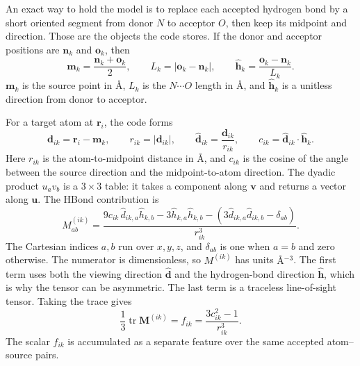 \documentclass[11pt]{article}
\begin{document}
An exact way to hold the model is to replace each accepted hydrogen bond by a
short oriented segment from donor \(N\) to acceptor \(O\), then keep its
midpoint and direction. Those are the objects the code stores. If the donor and
acceptor positions are \(\bm n_k\) and \(\bm o_k\), then
\begin{equation}
  \bm m_k = \frac{\bm n_k+\bm o_k}{2},\qquad
  L_k = |\bm o_k-\bm n_k|,\qquad
  \hat{\bm h}_k = \frac{\bm o_k-\bm n_k}{L_k}.
  \label{eq:source}
\end{equation}
\(\bm m_k\) is the source point in \(\si{\angstrom}\), \(L_k\) is the
\(N\cdots O\) length in \(\si{\angstrom}\), and \(\hat{\bm h}_k\) is a
unitless direction from donor to acceptor.

For a target atom at \(\bm r_i\), the code forms
\begin{equation}
  \bm d_{ik} = \bm r_i-\bm m_k,\qquad
  r_{ik}=|\bm d_{ik}|,\qquad
  \hat{\bm d}_{ik}=\frac{\bm d_{ik}}{r_{ik}},\qquad
  c_{ik}=\hat{\bm d}_{ik}\cdot\hat{\bm h}_k .
  \label{eq:obs}
\end{equation}
Here \(r_{ik}\) is the atom-to-midpoint distance in \(\si{\angstrom}\), and
\(c_{ik}\) is the cosine of the angle between the source direction and the
midpoint-to-atom direction. The dyadic product \(u_a v_b\) is a \(3\times 3\)
table: it takes a component along \(\bm v\) and returns a vector along
\(\bm u\). The HBond contribution is
\begin{equation}
  M^{(ik)}_{ab} =
  \frac{
    9c_{ik}\,\hat d_{ik,a}\hat h_{k,b}
    -3\hat h_{k,a}\hat h_{k,b}
    -\left(3\hat d_{ik,a}\hat d_{ik,b}-\delta_{ab}\right)}
  {r_{ik}^{3}} .
  \label{eq:hbond}
\end{equation}
The Cartesian indices \(a,b\) run over \(x,y,z\), and \(\delta_{ab}\) is one
when \(a=b\) and zero otherwise. The numerator is dimensionless, so
\(M^{(ik)}\) has units \(\si{\angstrom^{-3}}\). The first term uses both the
viewing direction \(\hat{\bm d}\) and the hydrogen-bond direction
\(\hat{\bm h}\), which is why the tensor can be asymmetric. The last term is a
traceless line-of-sight tensor. Taking the trace gives
\begin{equation}
  \frac{1}{3}\operatorname{tr}\bm M^{(ik)}
  =
  f_{ik}
  =
  \frac{3c_{ik}^{2}-1}{r_{ik}^{3}} .
  \label{eq:f}
\end{equation}
The scalar \(f_{ik}\) is accumulated as a separate feature over the same
accepted atom--source pairs.
\end{document}
